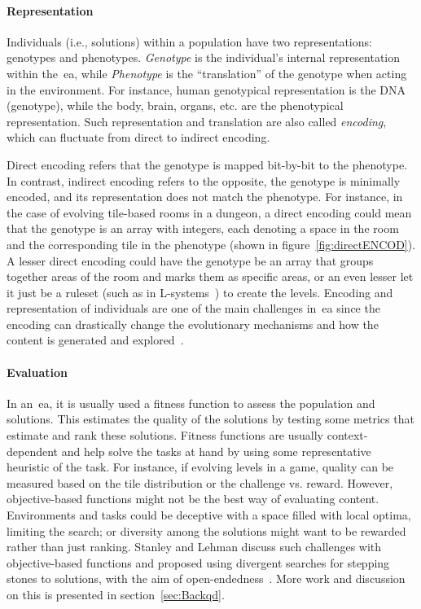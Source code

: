 \paragraph{Representation}
Individuals (i.e., solutions) within a population have two representations: genotypes and phenotypes. \emph{Genotype} is the individual's internal representation within the~\acrshort{ea}, while \emph{Phenotype} is the ``translation'' of the genotype when acting in the environment. For instance, human genotypical representation is the DNA (genotype), while the body, brain, organs, etc. are the phenotypical representation. Such representation and translation are also called \emph{encoding}, which can fluctuate from direct to indirect encoding. 

Direct encoding refers that the genotype is mapped bit-by-bit to the phenotype. In contrast, indirect encoding refers to the opposite, the genotype is minimally encoded, and its representation does not match the phenotype. For instance, in the case of evolving tile-based rooms in a dungeon, a direct encoding could mean that the genotype is an array with integers, each denoting a space in the room and the corresponding tile in the phenotype (shown in figure~\ref{fig:directENCOD}). A lesser direct encoding could have the genotype be an array that groups together areas of the room and marks them as specific areas, or an even lesser let it just be a ruleset (such as in L-systems~\cite{prusinkiewicz_algorithmic_1996,shaker_evolving_2012}) to create the levels. Encoding and representation of individuals are one of the main challenges in~\acrshort{ea} since the encoding can drastically change the evolutionary mechanisms and how the content is generated and explored~\cite{ashlock_representations_2016,clune_performance_2011,stanley_compositional_2007}.

\paragraph{Evaluation}

In an~\acrshort{ea}, it is usually used a fitness function to assess the population and solutions. This estimates the quality of the solutions by testing some metrics that estimate and rank these solutions. Fitness functions are usually context-dependent and help solve the tasks at hand by using some representative heuristic of the task. For instance, if evolving levels in a game, quality can be measured based on the tile distribution or the challenge vs. reward. However, objective-based functions might not be the best way of evaluating content. Environments and tasks could be deceptive with a space filled with local optima, limiting the search; or diversity among the solutions might want to be rewarded rather than just ranking. Stanley and Lehman discuss such challenges with objective-based functions and proposed using divergent searches for stepping stones to solutions, with the aim of open-endedness~\cite{stanley_why_2015}. More work and discussion on this is presented in section~\ref{sec:Backqd}.

